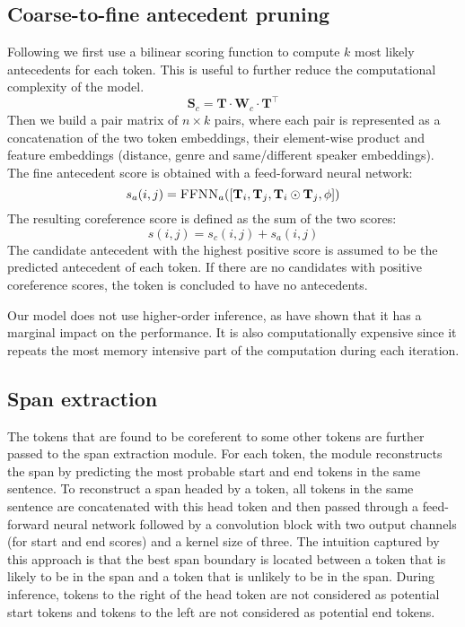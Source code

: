 \documentclass[11pt]{article}
\begin{document}
\subsection{Coarse-to-fine antecedent pruning}
Following \citet{lee-etal-2018-higher} we first use a bilinear scoring function to compute $k$ most likely antecedents for each token. This is useful to further reduce the computational complexity of the model.
\begin{equation}
    \textbf{S}_c = \mathbf{T} \cdot \mathbf{W}_c \cdot \mathbf{T}^\intercal
\end{equation}
Then we build a pair matrix of $n \times k$ pairs, where each pair is represented as a concatenation of the two token embeddings, their element-wise product and feature embeddings (distance, genre and same/different speaker embeddings). The fine antecedent score is obtained with a feed-forward neural network:
\begin{equation}
    s_a(i, j) = \textsc{FFNN}_a([\mathbf{T}_i, \mathbf{T}_j, \mathbf{T}_i \odot \mathbf{T}_j, \phi])
\end{equation}
The resulting coreference score is defined as the sum of the two scores:
\begin{equation}
    s(i, j) = s_c(i, j) + s_a(i, j)
\end{equation}
The candidate antecedent with the highest positive score is assumed to be the predicted antecedent of each token. If there are no candidates with positive coreference scores, the token is concluded to have no antecedents.

Our model does not use higher-order inference, as \citet{xu-choi-2020-revealing} have shown that it has a marginal impact on the performance. It is also computationally expensive since it repeats the most memory intensive part of the computation during each iteration.

\subsection{Span extraction}
The tokens that are found to be coreferent to some other tokens are further passed to the span extraction module. For each token, the module reconstructs the span by predicting the most probable start and end tokens in the same sentence. To reconstruct a span headed by a token, all tokens in the same sentence are concatenated with this head token and then passed through a feed-forward neural network followed by a convolution block with two output channels (for start and end scores) and a kernel size of three. The intuition captured by this approach is that the best span boundary is located between a token that is likely to be in the span and a token that is unlikely to be in the span. During inference, tokens to the right of the head token are not considered as potential start tokens and tokens to the left are not considered as potential end tokens.
\end{document}
